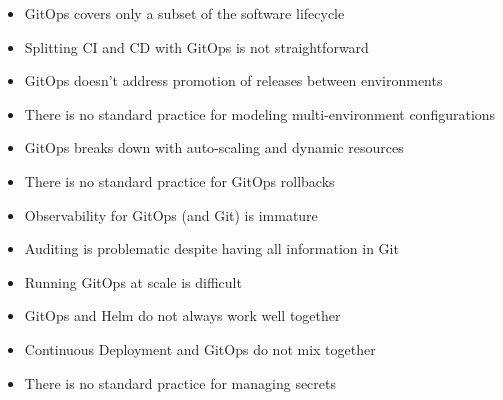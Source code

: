 \begin{itemize}
	\item GitOps covers only a subset of the software lifecycle
	\item Splitting CI and CD with GitOps is not straightforward
	\item GitOps doesn’t address promotion of releases between environments
	\item There is no standard practice for modeling multi-environment configurations
	\item GitOps breaks down with auto-scaling and dynamic resources
	\item There is no standard practice for GitOps rollbacks
	\item Observability for GitOps (and Git) is immature
	\item Auditing is problematic despite having all information in Git
	\item Running GitOps at scale is difficult
	\item GitOps and Helm do not always work well together
	\item Continuous Deployment and GitOps do not mix together
	\item There is no standard practice for managing secrets
\end{itemize}

\noindent
\autocite{codefreshGitopsPains10}
\bigskip





